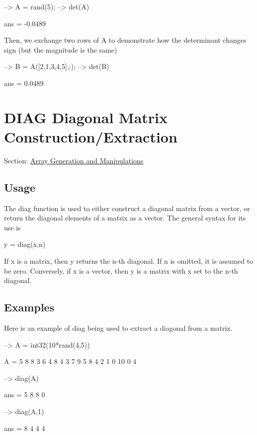 \begin{DoxyVerbInclude}
--> A = rand(5);
--> det(A)

ans = 
   -0.0489 
\end{DoxyVerbInclude}


Then, we exchange two rows of {\ttfamily A} to demonstrate how the determinant changes sign (but the magnitude is the same)


\begin{DoxyVerbInclude}
--> B = A([2,1,3,4,5],:);
--> det(B)

ans = 
    0.0489 
\end{DoxyVerbInclude}
 \hypertarget{array_diag}{}\section{D\-I\-A\-G Diagonal Matrix Construction/\-Extraction}\label{array_diag}
Section\-: \hyperlink{sec_array}{Array Generation and Manipulations} \hypertarget{vtkwidgets_vtkxyplotwidget_Usage}{}\subsection{Usage}\label{vtkwidgets_vtkxyplotwidget_Usage}
The {\ttfamily diag} function is used to either construct a diagonal matrix from a vector, or return the diagonal elements of a matrix as a vector. The general syntax for its use is \begin{DoxyVerb}  y = diag(x,n)
\end{DoxyVerb}
 If {\ttfamily x} is a matrix, then {\ttfamily y} returns the {\ttfamily n}-\/th diagonal. If {\ttfamily n} is omitted, it is assumed to be zero. Conversely, if {\ttfamily x} is a vector, then {\ttfamily y} is a matrix with {\ttfamily x} set to the {\ttfamily n}-\/th diagonal. \hypertarget{variables_matrix_Examples}{}\subsection{Examples}\label{variables_matrix_Examples}
Here is an example of {\ttfamily diag} being used to extract a diagonal from a matrix.


\begin{DoxyVerbInclude}
--> A = int32(10*rand(4,5))

A = 
  5  8  8  3  6 
  4  8  4  3  7 
  9  5  8  4  2 
  1  0 10  0  4 

--> diag(A)

ans = 
 5 
 8 
 8 
 0 

--> diag(A,1)

ans = 
 8 
 4 
 4 
 4 
\end{DoxyVerbInclude}


